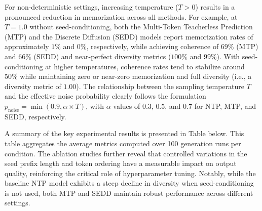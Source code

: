 \documentclass{article} %
\begin{document}
For non-deterministic settings, increasing temperature (\(T>0\)) results in a pronounced reduction in memorization across all methods. For example, at \(T=1.0\) without seed-conditioning, both the Multi-Token Teacherless Prediction (MTP) and the Discrete Diffusion (SEDD) models report memorization rates of approximately \(1\%\) and \(0\%\), respectively, while achieving coherence of \(69\%\) (MTP) and \(66\%\) (SEDD) and near-perfect diversity metrics (\(100\%\) and \(99\%\)). With seed-conditioning at higher temperatures, coherence rates tend to stabilize around \(50\%\) while maintaining zero or near-zero memorization and full diversity (i.e., a diversity metric of \(1.00\)). The relationship between the sampling temperature \(T\) and the effective noise probability clearly follows the formulation \(p_{\text{noise}} = \min(0.9, \alpha \times T)\), with \(\alpha\) values of \(0.3\), \(0.5\), and \(0.7\) for NTP, MTP, and SEDD, respectively.

A summary of the key experimental results is presented in Table below. This table aggregates the average metrics computed over 100 generation runs per condition. The ablation studies further reveal that controlled variations in the seed prefix length and token ordering have a measurable impact on output quality, reinforcing the critical role of hyperparameter tuning. Notably, while the baseline NTP model exhibits a steep decline in diversity when seed-conditioning is not used, both MTP and SEDD maintain robust performance across different settings.
\end{document}
